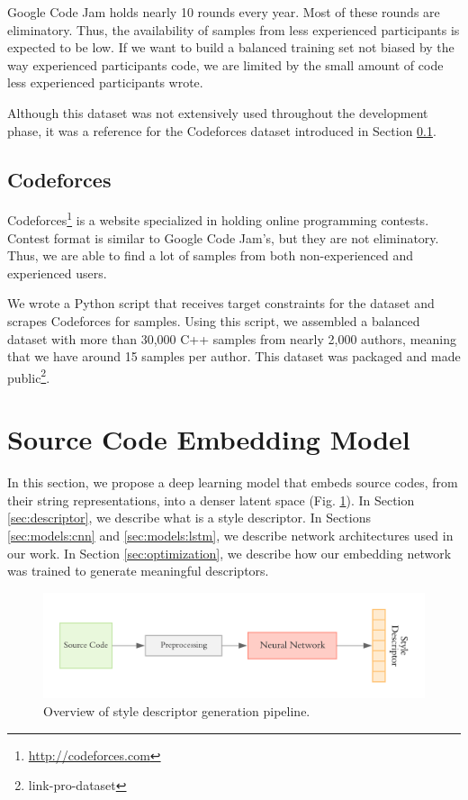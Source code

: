 Google Code Jam holds nearly 10 rounds every year. Most of these rounds are eliminatory. Thus, the availability of samples from less experienced participants is expected to be low. If we want to build a balanced training set not biased by the way experienced participants code, we are limited by the small amount of code less experienced participants wrote.

Although this dataset was not extensively used throughout the development phase, it was a reference for the Codeforces dataset introduced in Section \ref{sec:codeforces}.

\subsection{Codeforces}\label{sec:codeforces}

Codeforces\footnote{\url{http://codeforces.com}} is a website specialized in holding online programming contests. Contest format is similar to Google Code Jam's, but they are not eliminatory. Thus, we are able to find a lot of samples from both non-experienced and experienced users.

We wrote a Python script that receives target constraints for the dataset and scrapes Codeforces for samples. Using this script, we assembled a balanced dataset with more than 30,000 C++ samples from nearly 2,000 authors, meaning that we have around 15 samples per author. This dataset was packaged and made public\footnote{link-pro-dataset}.

\section{Source Code Embedding Model}\label{sec:framework}

In this section, we propose a deep learning model that embeds source codes, from their string representations, into a denser latent space (Fig. \ref{fig:overall}). In Section \ref{sec:descriptor}, we describe what is a style descriptor. In Sections \ref{sec:models:cnn} and \ref{sec:models:lstm}, we describe network architectures used in our work. In Section \ref{sec:optimization}, we describe how our embedding network was trained to generate meaningful descriptors.

\begin{figure}[ht]
	\centering
	\includegraphics[width=\linewidth]{imgs/pipeline.pdf}
	\caption{Overview of style descriptor generation pipeline.}
	\label{fig:overall}
\end{figure}

